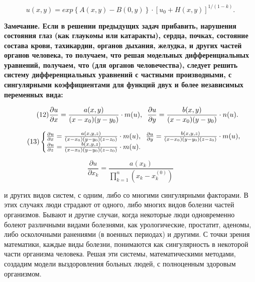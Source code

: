 \documentclass[11pt, a4paper]{article}
\begin{document}
	\begin{equation} \tag{11}
		u(x,y)=exp\left\{A(x,y)-B(0,y)\right\}\cdot\left[u_0+H(x,y)\right]^{1/(1-k)}.
	\end{equation}
	
	\bf Замечание. \rm Если в решении предыдущих задач прибавить,   нарушения  состояния глаз (как глаукомы или катаракты), сердца, почках, состояние состава крови, тахикардии,  органов дыхания, желудка, и других частей органов человека, то получаем, что решая модельных дифференциальных уравнений, получаем, что (для органов человечества), следует решить систему дифференциальных уравнений с частными  производными, с сингулярными коэффициентами  для функций двух и более независимых переменных вида:
	
	\begin{equation} \tag{12}
		\frac{\partial u}{\partial x}=\frac{a(x,y)}{(x-x_0)(y-y_0)}\cdot m(u),\hspace{0.2cm}\frac{\partial u}{\partial y}=\frac{b(x,y)}{(x-x_0)(y-y_0)}\cdot n(u).
	\end{equation}
	
	\begin{equation} \tag{13}
		\begin{cases} 
			\frac{\partial u}{\partial x}=\frac{a(x,y,z)}{(x-x_0)(y-y_0)(z-z_0)}\cdot m(u),\hspace{0.2cm}\frac{\partial u}{\partial y}=\frac{b(x,y,z)}{(x-x_0)(y-y_0)(z-z_0)}\cdot m(u),\\
			\frac{\partial u}{\partial z}=\frac{b(x,y,z)}{(x-x_0)(y-y_0)(z-z_0)}\cdot m(u).
		\end{cases}
	\end{equation}
	
	\begin{equation} \tag{14}
		\frac{\partial u}{\partial x_k}=\frac{a(x_k)}{\prod\limits_{k=1}^{n}(x_k-x_k^{(0)})}
	\end{equation}
	
	\vspace{7cm}
	
	и других  видов  систем, с одним, либо со многими сингулярными факторами. В этих случаях люди страдают от  одного, либо многих видов болезни  частей организмов. Бывают и другие случаи, когда некоторые люди одновременно болеют различными видами болезнями, как урологические, простатит, аденомы, либо осколочными ранениями (в военных периодах) и другими. С точки зрения математики, каждые виды болезни, понимаются как сингулярность в некоторой части организма человека. Решая эти системы, математическими методами, создадим модели выздоровления больных людей, с полноценным  здоровым организмом.
	
\end{document}
